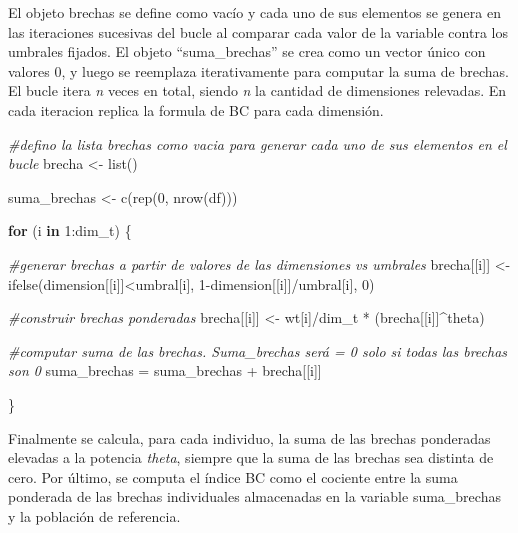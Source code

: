 \documentclass[
]{book}
\newenvironment{Shaded}{\begin{snugshade}}{\end{snugshade}}
\newcommand{\CommentTok}[1]{\textcolor[rgb]{0.56,0.35,0.01}{\textit{#1}}}
\newcommand{\ControlFlowTok}[1]{\textcolor[rgb]{0.13,0.29,0.53}{\textbf{#1}}}
\newcommand{\DecValTok}[1]{\textcolor[rgb]{0.00,0.00,0.81}{#1}}
\newcommand{\FunctionTok}[1]{\textcolor[rgb]{0.00,0.00,0.00}{#1}}
\newcommand{\NormalTok}[1]{#1}
\newcommand{\OtherTok}[1]{\textcolor[rgb]{0.56,0.35,0.01}{#1}}
\newcommand{\SpecialCharTok}[1]{\textcolor[rgb]{0.00,0.00,0.00}{#1}}
\begin{document}
El objeto brechas se define como vacío y cada uno de sus elementos se genera en las iteraciones sucesivas del bucle al comparar cada valor de la variable contra los umbrales fijados. El objeto ``suma\_brechas'' se crea como un vector único con valores 0, y luego se reemplaza iterativamente para computar la suma de brechas. El bucle itera \emph{n} veces en total, siendo \emph{n} la cantidad de dimensiones relevadas. En cada iteracion replica la formula de BC para cada dimensión.

\begin{Shaded}
\begin{Highlighting}[]
\CommentTok{\#defino la lista brechas como vacia para generar cada uno de sus elementos en el bucle}
\NormalTok{brecha }\OtherTok{\textless{}{-}} \FunctionTok{list}\NormalTok{()}

\NormalTok{suma\_brechas }\OtherTok{\textless{}{-}} \FunctionTok{c}\NormalTok{(}\FunctionTok{rep}\NormalTok{(}\DecValTok{0}\NormalTok{, }\FunctionTok{nrow}\NormalTok{(df)))}

\ControlFlowTok{for}\NormalTok{ (i }\ControlFlowTok{in} \DecValTok{1}\SpecialCharTok{:}\NormalTok{dim\_t) \{}
  
  \CommentTok{\#generar brechas a partir de valores de las dimensiones vs umbrales}
\NormalTok{  brecha[[i]] }\OtherTok{\textless{}{-}} \FunctionTok{ifelse}\NormalTok{(dimension[[i]]}\SpecialCharTok{\textless{}}\NormalTok{umbral[i], }\DecValTok{1}\SpecialCharTok{{-}}\NormalTok{dimension[[i]]}\SpecialCharTok{/}\NormalTok{umbral[i], }\DecValTok{0}\NormalTok{)}
  
  \CommentTok{\#construir brechas ponderadas}
\NormalTok{  brecha[[i]] }\OtherTok{\textless{}{-}}\NormalTok{ wt[i]}\SpecialCharTok{/}\NormalTok{dim\_t }\SpecialCharTok{*}\NormalTok{ (brecha[[i]]}\SpecialCharTok{\^{}}\NormalTok{theta)}
  
  \CommentTok{\#computar suma de las brechas. Suma\_brechas será = 0 solo si todas las brechas son 0}
\NormalTok{  suma\_brechas }\OtherTok{=}\NormalTok{ suma\_brechas }\SpecialCharTok{+}\NormalTok{ brecha[[i]]}
  
\NormalTok{\}}
\end{Highlighting}
\end{Shaded}

Finalmente se calcula, para cada individuo, la suma de las brechas ponderadas elevadas a la potencia \emph{theta}, siempre que la suma de las brechas sea distinta de cero. Por último, se computa el índice BC como el cociente entre la suma ponderada de las brechas individuales almacenadas en la variable suma\_brechas y la población de referencia.
\end{document}
